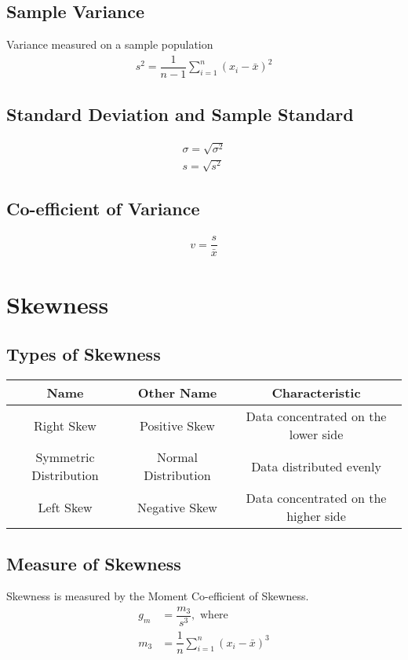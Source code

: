 \subsection{Sample Variance}
Variance measured on a sample population
\begin{align}
	s^2 = \dfrac{1}{n-1} \sum_{i=1}^{n} \left( x_i - \bar{x} \right)^2
\end{align}

\subsection{Standard Deviation and Sample Standard}
\begin{align}
	\sigma = \sqrt{\sigma^2}\\
	s=\sqrt{s^2}
\end{align}

\subsection{Co-efficient of Variance}
\begin{align}
	v = \dfrac{s}{\bar{x}}
\end{align}


\section{Skewness}
\subsection{Types of Skewness}
\begin{table}[htbp]
	\centering
	\begin{tabular}{c c c}
		\toprule
		Name & Other Name & Characteristic\\
		\midrule
		Right Skew & Positive Skew & Data concentrated on the lower side\\
		Symmetric Distribution & Normal Distribution & Data distributed evenly\\
		Left Skew & Negative Skew & Data concentrated on the higher side\\
		\bottomrule
	\end{tabular}
\end{table}

\subsection{Measure of Skewness}
Skewness is measured by the Moment Co-efficient of Skewness.
\begin{align}
	g_m &= \dfrac{m_3}{s^3}, \text{ where}\\
	m_3 &= \dfrac{1}{n}\sum_{i=1}^{n} \left( x_i - \bar{x} \right)^3
\end{align}

